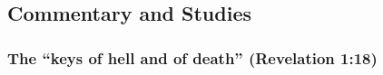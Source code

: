 

	
	
	
	
\subsection{Commentary and Studies} %
	\label{KEY-COMMENTARY}

	
		
	\subsubsection{The ``keys of hell and of death'' (Revelation 1:18)}
		\label{KEY-study}
		
